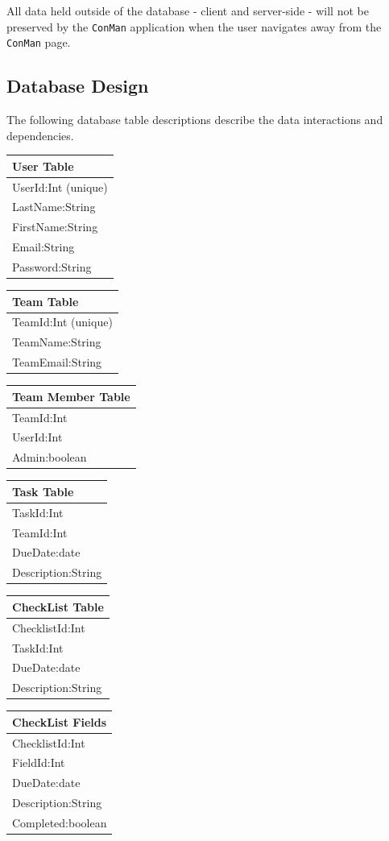 \documentclass{article}
\begin{document}
All data held outside of the database - client and server-side -  will not be preserved by the \texttt{ConMan} application when the user navigates away from the \texttt{ConMan} page.

\subsection{Database Design}
The following database table descriptions describe the data interactions and dependencies.

\begin{tabular}{|l|} \hline
    \textbf{User Table} \\ \hline
    UserId:Int (unique)\\
    LastName:String\\
    FirstName:String\\
    Email:String\\
    Password:String\\ \hline
\end{tabular}
\hfill
\begin{tabular}{|l|} \hline
    \textbf{Team Table} \\ \hline
    TeamId:Int (unique)\\
    TeamName:String \\
    TeamEmail:String\\ \hline
\end{tabular}

\begin{tabular}{|l|} \hline
    \textbf{Team Member Table} \\ \hline
    TeamId:Int\\
    UserId:Int\\
    Admin:boolean\\ \hline
\end{tabular}
\hfill
\begin{tabular}{|l|} \hline
    \textbf{Task Table} \\ \hline
    TaskId:Int\\
    TeamId:Int\\
    DueDate:date\\
    Description:String\\ \hline
\end{tabular}

\begin{tabular}{|l|} \hline
    \textbf{CheckList Table} \\ \hline
    ChecklistId:Int\\
    TaskId:Int\\
    DueDate:date\\
    Description:String\\ \hline
\end{tabular}
\hfill
\begin{tabular}{|l|} \hline
    \textbf{CheckList Fields} \\ \hline
    ChecklistId:Int\\
    FieldId:Int\\
    DueDate:date\\
    Description:String\\
    Completed:boolean\\ \hline
\end{tabular}
\end{document}

